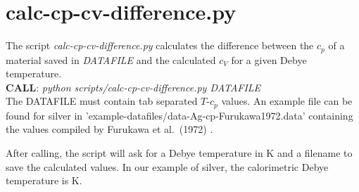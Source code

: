 %
\section{calc-cp-cv-difference.py}
The script \emph{calc-cp-cv-difference.py} calculates the difference between the $c_p$ of a material saved in \emph{DATAFILE} and the calculated $c_V$ for a given Debye temperature.\\

\textbf{CALL}: \emph{python scripts/calc-cp-cv-difference.py DATAFILE}\\

The DATAFILE must contain tab separated $T$-$c_p$ values. An example file can be found for silver in 'example-datafiles/data-Ag-cp-Furukawa1972.data' containing the values compiled by Furukawa et al.~(1972) \cite{Furukawa1972}.

After calling, the script will ask for a Debye temperature in K and a filename to save the calculated values. In our example of silver, the calorimetric Debye temperature is \unit[215]{K}.
